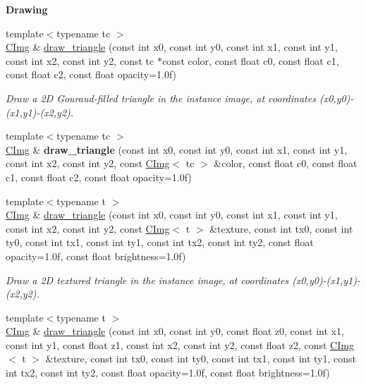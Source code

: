 \begin{Indent}{\bf Drawing}
\begin{DoxyCompactItemize}
\item 
{\footnotesize template$<$typename tc $>$ }\\\hyperlink{structcimg__library_1_1_c_img}{C\-Img} \& \hyperlink{structcimg__library_1_1_c_img_a18f1e6e2064b5ab2b657daf10533dbbd}{draw\-\_\-triangle} (const int x0, const int y0, const int x1, const int y1, const int x2, const int y2, const tc $\ast$const color, const float c0, const float c1, const float c2, const float opacity=1.\-0f)
\begin{DoxyCompactList}\small\item\em Draw a 2\-D Gouraud-\/filled triangle in the instance image, at coordinates ({\ttfamily x0},{\ttfamily y0})-\/({\ttfamily x1},{\ttfamily y1})-\/({\ttfamily x2},{\ttfamily y2}). \end{DoxyCompactList}\item 
\hypertarget{structcimg__library_1_1_c_img_a0c9afd9bcddb5d3202fc0de352a69b37}{{\footnotesize template$<$typename tc $>$ }\\\hyperlink{structcimg__library_1_1_c_img}{C\-Img} \& {\bfseries draw\-\_\-triangle} (const int x0, const int y0, const int x1, const int y1, const int x2, const int y2, const \hyperlink{structcimg__library_1_1_c_img}{C\-Img}$<$ tc $>$ \&color, const float c0, const float c1, const float c2, const float opacity=1.\-0f)}\label{structcimg__library_1_1_c_img_a0c9afd9bcddb5d3202fc0de352a69b37}

\item 
{\footnotesize template$<$typename t $>$ }\\\hyperlink{structcimg__library_1_1_c_img}{C\-Img} \& \hyperlink{structcimg__library_1_1_c_img_aeb2620e63dd23f61667bb119b0fed9dd}{draw\-\_\-triangle} (const int x0, const int y0, const int x1, const int y1, const int x2, const int y2, const \hyperlink{structcimg__library_1_1_c_img}{C\-Img}$<$ t $>$ \&texture, const int tx0, const int ty0, const int tx1, const int ty1, const int tx2, const int ty2, const float opacity=1.\-0f, const float brightness=1.\-0f)
\begin{DoxyCompactList}\small\item\em Draw a 2\-D textured triangle in the instance image, at coordinates ({\ttfamily x0},{\ttfamily y0})-\/({\ttfamily x1},{\ttfamily y1})-\/({\ttfamily x2},{\ttfamily y2}). \end{DoxyCompactList}\item 
\hypertarget{structcimg__library_1_1_c_img_a65110b2cc36e038d43570611e2783284}{{\footnotesize template$<$typename t $>$ }\\\hyperlink{structcimg__library_1_1_c_img}{C\-Img} \& \hyperlink{structcimg__library_1_1_c_img_a65110b2cc36e038d43570611e2783284}{draw\-\_\-triangle} (const int x0, const int y0, const float z0, const int x1, const int y1, const float z1, const int x2, const int y2, const float z2, const \hyperlink{structcimg__library_1_1_c_img}{C\-Img}$<$ t $>$ \&texture, const int tx0, const int ty0, const int tx1, const int ty1, const int tx2, const int ty2, const float opacity=1.\-0f, const float brightness=1.\-0f)}\label{structcimg__library_1_1_c_img_a65110b2cc36e038d43570611e2783284}


\end{DoxyCompactItemize}
\end{Indent}
